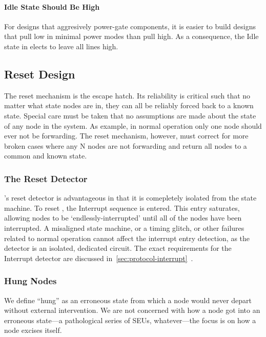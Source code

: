 \paragraph{Idle State Should Be High}
For designs that aggresively power-gate components, it is easier to build
designs that pull low in minimal power modes than pull high. As a consequence,
the Idle state in \bus elects to leave all lines high.

\subsection{Reset Design}
\label{sec:design-reset}
The reset mechanism is the \bus escape hatch. Its reliability is critical such
that no matter what state \bus nodes are in, they can all be reliably forced
back to a known state. Special care must be taken that no assumptions are made
about the state of any node in the system. As example, in normal operation
only one node should ever not be forwarding. The reset mechanism, however,
must correct for more broken cases where any N nodes are not forwarding and
return all nodes to a common and known state.

\subsubsection{The Reset Detector}
\bus's reset detector is advantageous in that it is comepletely isolated from
the \bus state machine. To reset \bus, the Interrupt sequence is entered. This
entry saturates, allowing nodes to be `endlessly-interrupted' until all of the
nodes have been interrupted. A misaligned state machine, or a timing glitch,
or other failures related to normal operation cannot affect the interrupt
entry detection, as the detector is an isolated, dedicated circuit. The exact
requirements for the Interrupt detector are discussed
in~\ref{sec:protocol-interrupt}~.

\subsubsection{Hung Nodes}
\label{sec:reset-hung}
We define ``hung'' as an erroneous state from which a node would never depart
without external intervention. We are not concerned with how a node got into
an erroneous state---a pathological series of SEUs, whatever---the focus is on
how a node excises itself.

